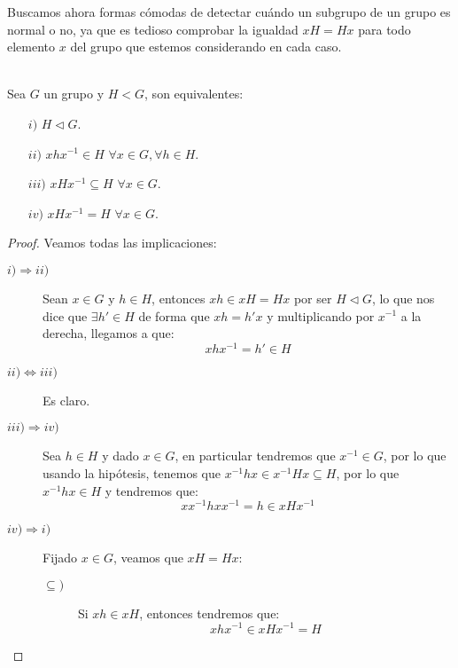 \noindent
Buscamos ahora formas cómodas de detectar cuándo un subgrupo de un grupo es normal o no, ya que es tedioso comprobar la igualdad $xH=Hx$ para todo elemento $x$ del grupo que estemos considerando en cada caso.
\begin{prop}\ \\
    Sea $G$ un grupo y ${H<G}$, son equivalentes:
    \begin{enumerate}
        \item[$i)$] $H\lhd G$.
        \item[$ii)$] $xhx^{-1}\in H$ $\forall x\in G, \forall h\in H$.
        \item[$iii)$] $xHx^{-1}\subseteq H$ $\forall x\in G$.
        \item[$iv)$] $xHx^{-1} = H$ $\forall x\in G$.
    \end{enumerate}
    \begin{proof}
        Veamos todas las implicaciones:
        \begin{description}
            \item [$i)\Longrightarrow ii)$]
                Sean $x\in G$ y $h\in H$, entonces $xh \in xH = Hx$ por ser $H\lhd G$, lo que nos dice que $\exists h'\in H$ de forma que $xh = h'x$ y multiplicando por $x^{-1}$ a la derecha, llegamos a que:
                \begin{equation*}
                    xhx^{-1} = h' \in H
                \end{equation*}
            \item [$ii)\Longleftrightarrow iii)$] Es claro.
            \item [$iii)\Longrightarrow iv)$] Sea $h\in H$ y dado $x\in G$, en particular tendremos que $x^{-1}\in G$, por lo que usando la hipótesis, tenemos que $x^{-1}hx \in x^{-1}Hx \subseteq H$, por lo que $x^{-1}hx\in H$ y tendremos que:
                \begin{equation*}
                    xx^{-1}hxx^{-1} = h \in xHx^{-1}
                \end{equation*}
            \item [$iv)\Longrightarrow i)$] Fijado $x\in G$, veamos que $xH=Hx$:
                \begin{description}
                    \item [$\subseteq)$] Si $xh\in xH$, entonces tendremos que:
                        \begin{equation*}
                            xhx^{-1} \in xHx^{-1}= H
                        \end{equation*}

\end{description}
\end{description}
\end{proof}
\end{prop}

